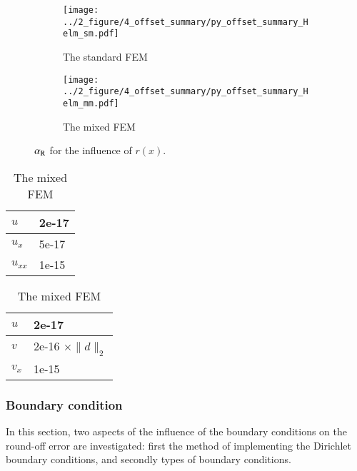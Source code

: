 \documentclass[review,3p]{elsarticle}
\begin{document}
\begin{figure}[!ht]
	\centering
    \begin{subfigure}{6.0cm}
        \texttt{[image: ../2\_figure/4\_offset\_summary/py\_offset\_summary\_Helm\_sm.pdf]}
        \caption{The standard FEM}
        \label{py_offset_summary_Helm_sm}
    \end{subfigure}
    \hspace{-0.2cm}
    \begin{subfigure}{6.0cm}
        \texttt{[image: ../2\_figure/4\_offset\_summary/py\_offset\_summary\_Helm\_mm.pdf]}
        \caption{The mixed FEM}
        \label{py_offset_summary_Helm_mm}
    \end{subfigure}
\caption{$\alpha_{\rm R}$ for the influence of $r(x)$.}
\label{py_offset_summary_Helm}
\end{figure}

\newpage
\begin{table}[!ht]
\small
{}
\hspace{4.2cm}
\begin{subtable}{0.4\textwidth}
\caption{The standard FEM}
\begin{tabular}{l l}
\hline
$u$ & 2e-17 \\ \hline
$u_x$ & 5e-17 \\ \hline
$u_{xx}$ & 1e-15 \\ \hline
\end{tabular}
\end{subtable}
\hspace{-2cm}
\begin{subtable}{.4\textwidth}
\caption{The mixed FEM}
\begin{tabular}{l l}
\hline
$u$ & 2e-17 \\ \hline
$v$ & 2e-16 $\times \|d\|_2$ \\ \hline
$v_x$ & 1e-15 \\ \hline
\end{tabular}
\end{subtable}
\label{relation_alpha_R_l2_norm}
\end{table}

\subsubsection{Boundary condition}	\label{section_BC}

In this section, two aspects of the influence of the boundary conditions on the round-off error are investigated: first the method of implementing the Dirichlet boundary conditions, and secondly types of boundary conditions. 
\end{document}
